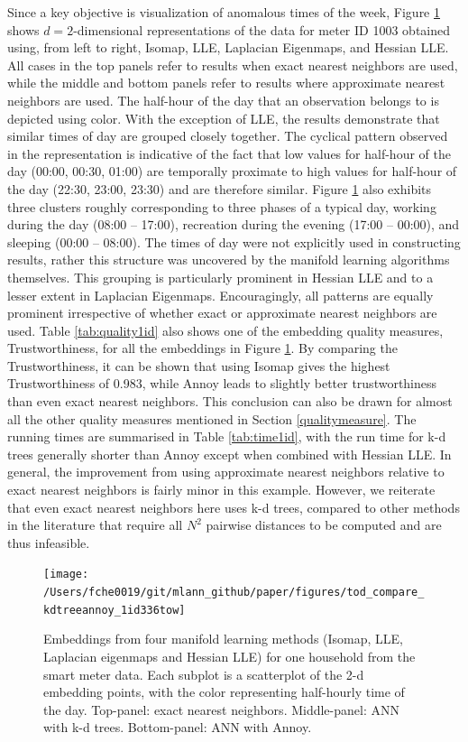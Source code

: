 \documentclass[12pt]{article}
\begin{document}
Since a key objective is visualization of anomalous times of the week, Figure \ref{fig:todplot} shows \(d=2\)-dimensional representations of the data for meter ID 1003 obtained using, from left to right, Isomap, LLE, Laplacian Eigenmaps, and Hessian LLE. All cases in the top panels refer to results when exact nearest neighbors are used, while the middle and bottom panels refer to results where approximate nearest neighbors are used. The half-hour of the day that an observation belongs to is depicted using color. With the exception of LLE, the results demonstrate that similar times of day are grouped closely together. The cyclical pattern observed in the representation is indicative of the fact that low values for half-hour of the day (00:00, 00:30, 01:00) are temporally proximate to high values for half-hour of the day (22:30, 23:00, 23:30) and are therefore similar. Figure \ref{fig:todplot} also exhibits three clusters roughly corresponding to three phases of a typical day, working during the day (08:00 -- 17:00), recreation during the evening (17:00 -- 00:00), and sleeping (00:00 -- 08:00). The times of day were not explicitly used in constructing results, rather this structure was uncovered by the manifold learning algorithms themselves. This grouping is particularly prominent in Hessian LLE and to a lesser extent in Laplacian Eigenmaps. Encouragingly, all patterns are equally prominent irrespective of whether exact or approximate nearest neighbors are used.
Table \ref{tab:quality1id} also shows one of the embedding quality measures, Trustworthiness, for all the embeddings in Figure \ref{fig:todplot}. By comparing the Trustworthiness, it can be shown that using Isomap gives the highest Trustworthiness of 0.983, while Annoy leads to slightly better trustworthiness than even exact nearest neighbors. This conclusion can also be drawn for almost all the other quality measures mentioned in Section \ref{qualitymeasure}. The running times are summarised in Table \ref{tab:time1id}, with the run time for k-d trees generally shorter than Annoy except when combined with Hessian LLE. In general, the improvement from using approximate nearest neighbors relative to exact nearest neighbors is fairly minor in this example. However, we reiterate that even exact nearest neighbors here uses k-d trees, compared to other methods in the literature that require all \(N^2\) pairwise distances to be computed and are thus infeasible.

\begin{figure}

{\centering \texttt{[image: /Users/fche0019/git/mlann\_github/paper/figures/tod\_compare\_kdtreeannoy\_1id336tow]} 

}

\caption{Embeddings from four manifold learning methods (Isomap, LLE, Laplacian eigenmaps and Hessian LLE) for one household from the smart meter data. Each subplot is a scatterplot of the 2-d embedding points, with the color representing half-hourly time of the day. Top-panel: exact nearest neighbors. Middle-panel: ANN with k-d trees. Bottom-panel: ANN with Annoy.}\label{fig:todplot}
\end{figure}
\end{document}
